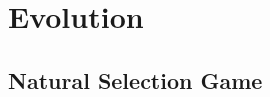 \section{Evolution} 

\begin{multicols}{2}




\subsection{Natural Selection Game} %



\end{multicols}
